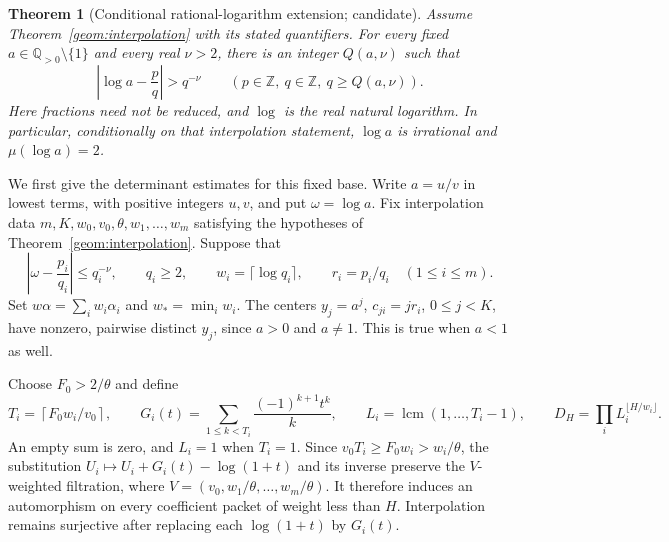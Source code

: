 \documentclass[11pt]{article}
\newcommand{\QQ}{\mathbb Q}
\newcommand{\ZZ}{\mathbb Z}
\DeclareMathOperator{\lcm}{lcm}
\newtheorem{theorem}{Theorem}[section]
\theoremstyle{definition}
\theoremstyle{remark}
\numberwithin{equation}{section}
\begin{document}
\begin{theorem}[Conditional rational-logarithm extension; candidate]
\label{rat:main}
Assume Theorem~\ref{geom:interpolation} with its stated quantifiers.
For every fixed $a\in\QQ_{>0}\setminus\{1\}$ and every real $\nu>2$,
there is an integer $Q(a,\nu)$ such that
\begin{equation}
 \left|\log a-\frac pq\right|>q^{-\nu}
 \qquad(p\in\ZZ,\ q\in\ZZ,\ q\ge Q(a,\nu)).
 \label{rat:eventual-bound}
\end{equation}
Here fractions need not be reduced, and $\log$ is the real natural
logarithm.  In particular, conditionally on that interpolation
statement, $\log a$ is irrational and $\mu(\log a)=2$.
\end{theorem}

We first give the determinant estimates for this fixed base.  Write
$a=u/v$ in lowest terms, with positive integers $u,v$, and put
$\omega=\log a$.  Fix interpolation data
$m,K,w_0,v_0,\theta,w_1,\ldots,w_m$ satisfying the hypotheses of
Theorem~\ref{geom:interpolation}.  Suppose that
\begin{equation}
 \left|\omega-\frac{p_i}{q_i}\right|\le q_i^{-\nu},\qquad
 q_i\ge2,\qquad w_i=\lceil\log q_i\rceil,\qquad
 r_i=p_i/q_i \quad(1\le i\le m).
 \label{rat:approximations}
\end{equation}
Set $w\alpha=\sum_iw_i\alpha_i$ and $w_*=\min_iw_i$.  The centers
$y_j=a^j$, $c_{ji}=jr_i$, $0\le j<K$, have nonzero, pairwise distinct
$y_j$, since $a>0$ and $a\ne1$.  This is true when $a<1$ as well.

Choose $F_0>2/\theta$ and define
\begin{equation}
 T_i=\left\lceil F_0w_i/v_0\right\rceil,\qquad
 G_i(t)=\sum_{1\le k<T_i}\frac{(-1)^{k+1}t^k}{k},\qquad
 L_i=\lcm(1,\ldots,T_i-1),\qquad
 D_H=\prod_iL_i^{\lfloor H/w_i\rfloor}.
 \label{rat:truncations}
\end{equation}
An empty sum is zero, and $L_i=1$ when $T_i=1$.
Since $v_0T_i\ge F_0w_i>w_i/\theta$, the substitution
$U_i\mapsto U_i+G_i(t)-\log(1+t)$ and its inverse preserve the
$V$-weighted filtration, where
$V=(v_0,w_1/\theta,\ldots,w_m/\theta)$.
It therefore induces an automorphism on every coefficient packet of
weight less than $H$.  Interpolation remains surjective after replacing
each $\log(1+t)$ by $G_i(t)$.
\end{document}
